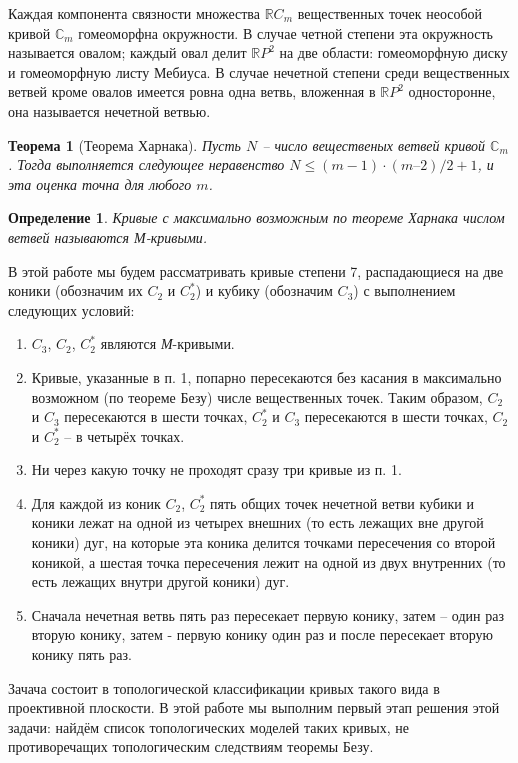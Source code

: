 \documentclass[14pt]{article}
\newtheorem{theorem}{Теорема}
\newtheorem{definition}{Определение}
\begin{document}
Каждая компонента связности множества  $\mathbb RC_m$ вещественных точек неособой кривой $\mathbb C_m$ гомеоморфна окружности. В случае четной степени эта окружность называется овалом; каждый овал делит $\mathbb RP^2$ на две области: гомеоморфную диску и гомеоморфную листу Мебиуса. В случае нечетной степени среди вещественных ветвей кроме овалов имеется ровна одна ветвь, вложенная в $\mathbb RP^2$ односторонне, она называется нечетной ветвью.

\begin{theorem}[Теорема Харнака]
Пусть $N$ -- число вещественых ветвей кривой $\mathbb C_m$. Тогда выполняется следующее неравенство $N \leqslant (m - 1) \cdot (m – 2)/2 + 1$, и эта оценка точна для любого $m$.
\end{theorem}

\begin{definition}
Кривые с максимально возможным по теореме Харнака числом ветвей называются М-кривыми.
\end{definition}

В этой работе мы будем рассматривать кривые степени 7, распадающиеся на две коники (обозначим их $C_2$ и $C_2^*$) и кубику (обозначим $C_3$) с выполнением следующих условий:

\begin{enumerate}
\item $C_3$, $C_2$, $C_2^*$ являются \textit{М}-кривыми.
\item Кривые, указанные в п. 1, попарно пересекаются без касания в максимально возможном (по теореме Безу) числе вещественных точек. Таким образом, $C_2$ и $C_3$ пересекаются в шести точках, $C_2^*$ и $C_3$ пересекаются в шести точках, $C_2$ и $C_2^*$ -- в  четырёх точках. 
\item Ни через какую точку не проходят сразу три кривые из п. 1.
\item Для каждой из коник $C_2$, $C_2^*$ пять общих точек нечетной ветви кубики и коники лежат на одной из четырех внешних (то есть лежащих вне другой коники) дуг, на которые эта коника делится точками пересечения со второй коникой, а шестая точка пересечения лежит на одной из двух внутренних (то есть лежащих внутри другой коники) дуг.
\item Сначала нечетная ветвь пять раз пересекает первую конику, затем -- один раз вторую конику, затем - первую конику один раз  и после пересекает вторую конику пять раз.
\end{enumerate}

Зачача состоит в топологической классификации кривых такого вида в проективной плоскости. В этой работе мы выполним первый этап решения этой задачи: найдём список топологических моделей таких кривых, не противоречащих топологическим следствиям теоремы Безу.
\end{document}
